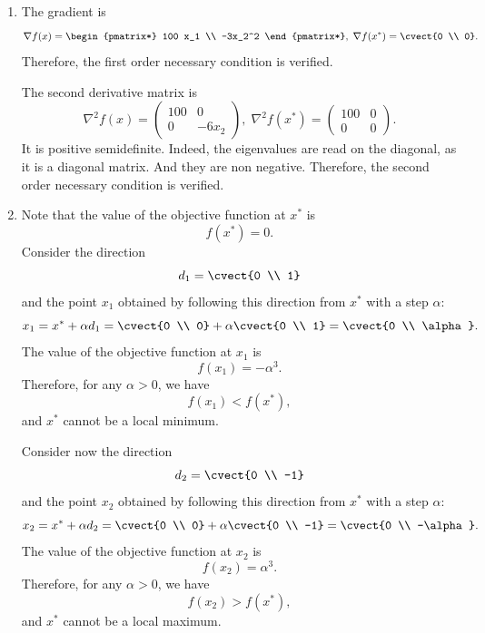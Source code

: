 

\begin{enumerate}
\item 
  The gradient is
\[
  \nabla f(x)= \begin{pmatrix*} 100 x_1
    \\ -3x_2^2 \end{pmatrix*}, \; \nabla f(x^*)= \cvect{0 \\ 0}.
  \]
  Therefore, the first order necessary condition is verified.

  The second derivative matrix is
  \[
  \nabla^2 f(x)= \begin{pmatrix*} 100 & 0\\ 0 &
    -6x_2 \end{pmatrix*}, \; \nabla^2 f(x^*)= \begin{pmatrix*} 100 & 0\\ 0 &
    0 \end{pmatrix*}.
  \]
It is positive semidefinite. Indeed, the eigenvalues are read on the
diagonal, as it is a diagonal matrix. And they are non
negative. Therefore,  the second order necessary condition
is verified.

\item Note that the value of the objective function at $x^*$ is
  \[
f(x^*) = 0.
  \]
  Consider the direction
  \[
  d_1=\cvect{0 \\ 1}
  \]
  and the point $x_1$ obtained by following this direction from $x^*$
  with a step
  $\alpha$:
  \[
x_1 = x^* + \alpha d_1 = \cvect{0 \\ 0} + \alpha \cvect{0 \\ 1} =
\cvect{0 \\ \alpha}.
\]
The value of the objective function at $x_1$ is
\[
f(x_1) = -\alpha^3.
\]
Therefore, for any $\alpha > 0$, we have
\[
f(x_1) < f(x^*), 
\]
and $x^*$ cannot be a local minimum. 

  Consider now the direction
  \[
  d_2=\cvect{0 \\ -1}
  \]
  and the point $x_2$ obtained by following this direction from $x^*$
  with a step
  $\alpha$:
  \[
x_2 = x^* + \alpha d_2 = \cvect{0 \\ 0} + \alpha \cvect{0 \\ -1} =
\cvect{0 \\ -\alpha}.
\]
The value of the objective function at $x_2$ is
\[
f(x_2) = \alpha^3.
\]
Therefore, for any $\alpha > 0$, we have
\[
f(x_2) > f(x^*), 
\]
and $x^*$ cannot be a local maximum. 

\end{enumerate}

